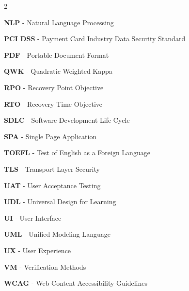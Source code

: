 \begin{multicols}{2}
\begin{description}
    \item \textbf{NLP} - Natural Language Processing
    \item \textbf{PCI DSS} - Payment Card Industry Data Security Standard
    \item \textbf{PDF} - Portable Document Format
    \item \textbf{QWK} - Quadratic Weighted Kappa
    \item \textbf{RPO} - Recovery Point Objective
    \item \textbf{RTO} - Recovery Time Objective
    \item \textbf{SDLC} - Software Development Life Cycle
    \item \textbf{SPA} - Single Page Application
    \item \textbf{TOEFL} - Test of English as a Foreign Language
    \item \textbf{TLS} - Transport Layer Security
    \item \textbf{UAT} - User Acceptance Testing
    \item \textbf{UDL} - Universal Design for Learning
    \item \textbf{UI} - User Interface
    \item \textbf{UML} - Unified Modeling Language
    \item \textbf{UX} - User Experience
    \item \textbf{VM} - Verification Methods 
    \item \textbf{WCAG} - Web Content Accessibility Guidelines
\end{description}
\end{multicols}
